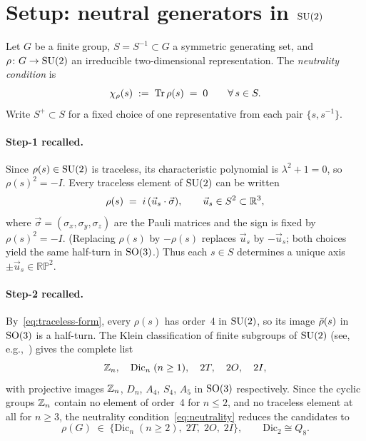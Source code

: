 \section{Setup: neutral generators in $\mathrm{SU}(2)$}
  \label{sec:setup}

  Let $G$ be a finite group, $S = S^{-1} \subset G$ a symmetric generating set, and
  $\rho\colon G \to \mathrm{SU}(2)$ an irreducible two-dimensional representation.
  The \emph{neutrality condition} is
  \begin{equation}
    \chi_\rho(s) \;:=\; \mathrm{Tr}\,\rho(s) \;=\; 0
    \qquad \forall\, s \in S.
    \label{eq:neutrality}
  \end{equation}
  Write $S^+ \subset S$ for a fixed choice of one representative from each pair
  $\{s, s^{-1}\}$.

  \paragraph{Step-1 recalled.}
    Since $\rho(s) \in \mathrm{SU}(2)$ is traceless, its characteristic polynomial is
    $\lambda^2 + 1 = 0$, so $\rho(s)^2 = -I$.
    Every traceless element of $\mathrm{SU}(2)$ can be written
    \begin{equation}
      \rho(s) \;=\; i\,(\vec{u}_s \cdot \vec{\sigma}),
      \qquad \vec{u}_s \in S^2 \subset \mathbb{R}^3,
      \label{eq:traceless-form}
    \end{equation}
    where $\vec{\sigma} = (\sigma_x, \sigma_y, \sigma_z)$ are the Pauli matrices and the
    sign is fixed by $\rho(s)^2 = -I$.
    (Replacing $\rho(s)$ by $-\rho(s)$ replaces $\vec{u}_s$ by $-\vec{u}_s$;
    both choices yield the same half-turn in $\mathrm{SO}(3)$.)
    Thus each $s \in S$ determines a unique axis $\pm\vec{u}_s \in \mathbb{RP}^2$.

  \paragraph{Step-2 recalled.}
    By~\eqref{eq:traceless-form}, every $\rho(s)$ has order~4 in $\mathrm{SU}(2)$, so its image
    $\bar{\rho}(s)$ in $\mathrm{SO}(3)$ is a half-turn.
    The Klein classification of finite subgroups of $\mathrm{SU}(2)$ (see, e.g.,~\cite{Klein1876}) gives the complete list
    \[
      \mathbb{Z}_n,\quad \mathrm{Dic}_n\;(n \ge 1),\quad 2T,\quad 2O,\quad 2I,
    \]
    with projective images $\mathbb{Z}_n$, $D_n$, $A_4$, $S_4$, $A_5$ in $\mathrm{SO}(3)$ respectively.
    Since the cyclic groups $\mathbb{Z}_n$ contain no element of order~4 for $n \le 2$, and no
    traceless element at all for $n \ge 3$, the neutrality condition~\eqref{eq:neutrality}
    reduces the candidates to
    \begin{equation}
      \rho(G) \;\in\; \bigl\{\mathrm{Dic}_n\;(n \ge 2),\; 2T,\; 2O,\; 2I\bigr\},
      \qquad \mathrm{Dic}_2 \cong Q_8.
      \label{eq:step2}
    \end{equation}
